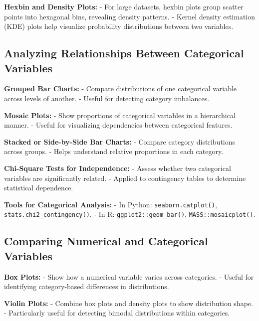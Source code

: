 \documentclass[12pt,openany, draft]{book}
\begin{document}
\textbf{Hexbin and Density Plots:}
- For large datasets, hexbin plots group scatter points into hexagonal bins, revealing density patterns.
- Kernel density estimation (KDE) plots help visualize probability distributions between two variables.
\newline

\subsection{Analyzing Relationships Between Categorical Variables}

\textbf{Grouped Bar Charts:}
- Compare distributions of one categorical variable across levels of another.
- Useful for detecting category imbalances.
\newline

\textbf{Mosaic Plots:}
- Show proportions of categorical variables in a hierarchical manner.
- Useful for visualizing dependencies between categorical features.
\newline

\textbf{Stacked or Side-by-Side Bar Charts:}
- Compare category distributions across groups.
- Helps understand relative proportions in each category.
\newline

\textbf{Chi-Square Tests for Independence:}
- Assess whether two categorical variables are significantly related.
- Applied to contingency tables to determine statistical dependence.
\newline

\textbf{Tools for Categorical Analysis:}
- In Python: \texttt{seaborn.catplot()}, \texttt{stats.chi2\_contingency()}.
- In R: \texttt{ggplot2::geom\_bar()}, \texttt{MASS::mosaicplot()}.
\newline

\subsection{Comparing Numerical and Categorical Variables}

\textbf{Box Plots:}
- Show how a numerical variable varies across categories.
- Useful for identifying category-based differences in distributions.
\newline

\textbf{Violin Plots:}
- Combine box plots and density plots to show distribution shape.
- Particularly useful for detecting bimodal distributions within categories.
\newline
\end{document}
